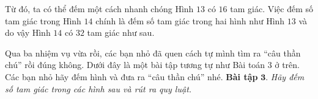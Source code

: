 	\begin{multicols}{2}
		Từ đó, ta có thể đếm một cách nhanh chóng Hình $13$ có $16$ tam giác. Việc đếm số tam giác trong Hình $14$ chính là đếm số tam giác trong hai hình như Hình $13$ và do vậy Hình $14$ có $32$ tam giác như sau.
		\begin{figure}[H]
			\centering
			\captionsetup{labelformat= empty, justification=centering}
			\captionsetup[subfigure]{labelformat=empty}
			\hfill{}
			\hfill
			\hfill
		\end{figure} 
	\end{multicols}
	Qua ba nhiệm vụ vừa rồi, các bạn nhỏ đã quen cách tự mình tìm ra “câu thần chú” rồi đúng không. Dưới đây là một bài tập tương tự như Bài toán $3$ ở trên. Các bạn nhỏ hãy đếm hình và đưa ra “câu thần chú” nhé.
	\vskip 0.1cm
	\textbf{\color{toancuabi}Bài tập} $\pmb{3}$. \textit{Hãy đếm số tam giác trong các hình sau và rút ra quy luật.}
	\begin{figure}[H]
		\centering
		\vspace*{-5pt}
		\captionsetup{labelformat= empty, justification=centering}
		\captionsetup[subfigure]{labelformat=empty}
		\hfill{}\hfill
		\hfill
		\vspace*{-5pt}
	\end{figure} 
